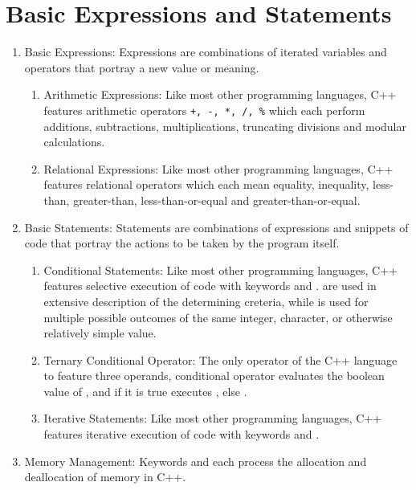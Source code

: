 \section{Basic Expressions and Statements}
\begin{enumerate}
\item Basic Expressions: Expressions are combinations of iterated variables
    and operators that portray a new value or meaning.
    \begin{enumerate}
    \item Arithmetic Expressions: Like most other programming languages, C++
        features arithmetic operators \verb|+, -, *, /, %| which each perform
        additions, subtractions, multiplications, truncating divisions and
        modular calculations. 
    \item Relational Expressions: Like most other programming languages, C++
        features relational operators \imc{==, !=, <, >, <=, >=} which each mean
        equality, inequality, less-than, greater-than, less-than-or-equal and
        greater-than-or-equal. 
    \end{enumerate}
\item Basic Statements: Statements are combinations of expressions and snippets
    of code that portray the actions to be taken by the program itself.
    \begin{enumerate}
    \item Conditional Statements: Like most other programming languages, C++
        features selective execution of code with keywords  and
        .  are used in extensive description of the
        determining creteria, while  is used for multiple possible
        outcomes of the same integer, character, or otherwise relatively simple
        value. 
    \item Ternary Conditional Operator: The only operator of the C++ language to
        feature three operands, conditional operator 
        evaluates the boolean value of , and if it is true executes
            , else . 
    \item Iterative Statements: Like most other programming languages, C++
        features iterative execution of code with keywords  and
        . 
    \end{enumerate}
\item Memory Management: Keywords  and  each process the
    allocation and deallocation of memory in C++.
\end{enumerate}
